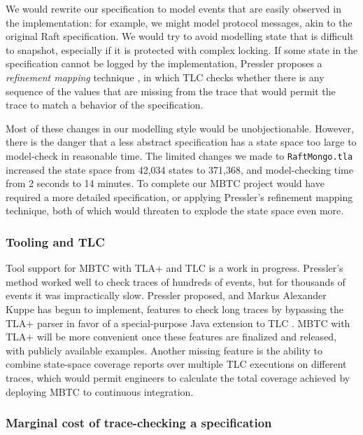 \documentclass{vldb}
\begin{document}
We would rewrite our specification to model events that are easily observed in the implementation: for example, we might model protocol messages, akin to the original Raft specification.
We would try to avoid modelling state that is difficult to snapshot, especially if it is protected with complex locking.
If some state in the specification cannot be logged by the implementation, Pressler proposes a \textit{refinement mapping} technique \cite{Pressler18VerifyingSoftwareTracesTLAPlus}, in which TLC checks whether there is any sequence of the values that are missing from the trace that would permit the trace to match a behavior of the specification.

Most of these changes in our modelling style would be unobjectionable.
However, there is the danger that a less abstract specification has a state space too large to model-check in reasonable time.
The limited changes we made to \texttt{RaftMongo.tla} increased the state space from 42,034 states to 371,368, and model-checking time from 2 seconds to 14 minutes.
To complete our MBTC project would have required a more detailed specification, or applying Pressler's refinement mapping technique, both of which would threaten to explode the state space even more.

\subsubsection{Tooling and TLC}
\label{subsubsec:mbtc_tla_tlc}

Tool support for MBTC with TLA+ and TLC is a work in progress. 
Pressler's method worked well to check traces of hundreds of events, but for thousands of events it was impractically slow. 
Pressler proposed, and Markus Alexander Kuppe has begun to implement, features to check long traces by bypassing the TLA+ parser in favor of a special-purpose Java extension to TLC \cite{TLAPlusIssue413}. 
MBTC with TLA+ will be more convenient once these features are finalized and released, with publicly available examples. 
Another missing feature is the ability to combine state-space coverage reports over multiple TLC executions on different traces, which would permit engineers to calculate the total coverage achieved by deploying MBTC to continuous integration.

\subsubsection{Marginal cost of trace-checking a specification}
\label{subsubsec:marginal_cost}
\end{document}
